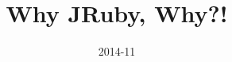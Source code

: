 \usepackage{etex}
\usepackage[english]{babel}

\usepackage[all]{xy}
\usepackage[latin1]{inputenc}

\usepackage{palatino,courier}
\usepackage{amsfonts,amssymb}
\usepackage[mathscr]{euscript}
\usepackage{stmaryrd}
\usepackage{eulervm}

\usepackage{proof}
\usepackage{amsmath}
\usepackage{xspace}

\usepackage{graphicx}
\usepackage{listings}
\usepackage{color}

\lstset{language=Ruby}
%
%
%




\title{Why JRuby, Why?!}

\author[Dr. Brett~Giles]{}



\date
{2014-11}

\subject{JRuby}




